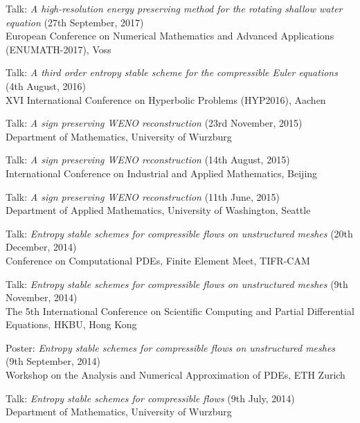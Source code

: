 \documentclass[margin]{res}
\begin{document}
\begin{resume}
              Talk: {\it A high-resolution energy preserving method for the rotating shallow water equation} (27th September, 2017)\\
               European Conference on Numerical Mathematics and Advanced Applications (ENUMATH-2017), Voss
              
              Talk: {\it A third order entropy stable scheme for the compressible Euler equations} (4th August, 2016)\\
               XVI International Conference on Hyperbolic Problems (HYP2016), Aachen 
              
              Talk: {\it A sign preserving WENO reconstruction} (23rd November, 2015)\\
               Department of Mathematics, University of W$\ddot{\text{u}}$rzburg 
              
              Talk: {\it A sign preserving WENO reconstruction} (14th August, 2015)\\
              International Conference on Industrial and Applied Mathematics, Beijing
              
              Talk: {\it A sign preserving WENO reconstruction} (11th June, 2015)\\
              Department of Applied Mathematics, University of Washington, Seattle
              
              Talk: {\it Entropy stable schemes for compressible flows on unstructured meshes} (20th December, 2014)\\
               Conference on Computational PDEs, Finite Element Meet, TIFR-CAM  
              
              Talk: {\it Entropy stable schemes for compressible flows on unstructured meshes} (9th November, 2014)\\
               The 5th International Conference on Scientific Computing and Partial Differential Equations, HKBU, Hong Kong              
             
              Poster: {\it Entropy stable schemes for compressible flows on unstructured meshes} (9th September, 2014)\\
               Workshop on the Analysis and Numerical Approximation of PDEs, ETH Zurich
              
              Talk: {\it Entropy stable schemes for compressible flows} (9th July, 2014)\\
               Department of Mathematics, University of W$\ddot{\text{u}}$rzburg             


\end{resume}
\end{document}
